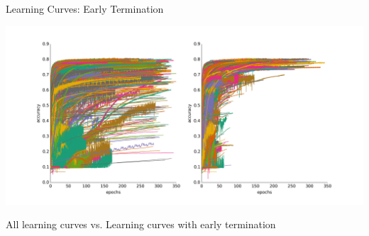\begin{frame}[c,fragile]{Learning Curves: Early Termination}

\centering
\includegraphics[width=\textwidth]{images/learning_curve_tuning}

All learning curves vs. Learning curves with early termination

\end{frame}

